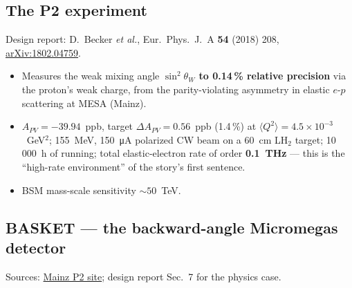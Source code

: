 \documentclass[11pt,a4paper]{article}
\begin{document}
\subsection*{The P2 experiment}

Design report: D.~Becker \emph{et al.}, Eur.\ Phys.\ J.\ A \textbf{54} (2018)
208, \href{https://arxiv.org/abs/1802.04759}{arXiv:1802.04759}.

\begin{itemize}[itemsep=2pt]
  \item Measures the weak mixing angle \textbf{$\sin^2\theta_W$ to 0.14\,\%
    relative precision} via the proton's weak charge, from the
    parity-violating asymmetry in elastic $e$-$p$ scattering at MESA (Mainz).
  \item $A_{PV} = -39.94$~ppb, target $\Delta A_{PV} = 0.56$~ppb (1.4\,\%) at
    $\langle Q^2\rangle = 4.5\times10^{-3}$~GeV$^2$; 155~MeV, 150~\si{\micro\ampere}
    polarized CW beam on a 60~cm LH$_2$ target; 10\,000~h of running; total
    elastic-electron rate of order \textbf{0.1~THz} --- this is the
    ``high-rate environment'' of the story's first sentence.
  \item BSM mass-scale sensitivity ${\sim}50$~TeV.
\end{itemize}

\subsection*{BASKET --- the backward-angle Micromegas detector}

Sources: \href{https://www.blogs.uni-mainz.de/fb08p2/the-p2-experiment/}{Mainz
P2 site}; design report Sec.~7 for the physics case.
\end{document}
